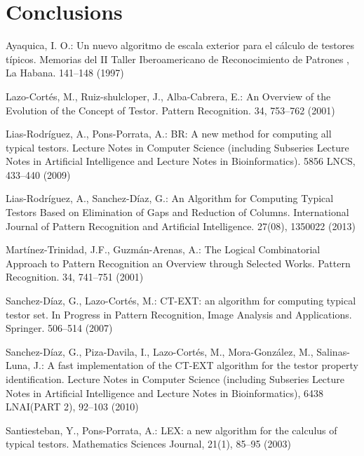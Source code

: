 \documentclass[citeauthoryear]{llncs}
\begin{document}
\section{Conclusions}
%
%
\begin{thebibliography}{}
%


	Ayaquica, I. O.:
	Un nuevo algoritmo de escala exterior para el c\'alculo de testores t\'ipicos.
	Memorias del II Taller Iberoamericano de Reconocimiento de Patrones , La
	Habana. 141--148 (1997)

	Lazo-Cort\'es, M., Ruiz-shulcloper, J., Alba-Cabrera, E.:
	An Overview of the Evolution of the Concept of Testor. 
	Pattern Recognition. 34, 753--762 (2001)

	Lias-Rodr\'iguez, A., Pons-Porrata, A.:
	BR: A new method for computing all typical testors. 
	Lecture Notes in Computer Science (including Subseries Lecture Notes 
	in Artificial Intelligence and Lecture Notes in Bioinformatics).
	5856 LNCS, 433--440 (2009)

	Lias-Rodr\'iguez, A., Sanchez-D\'iaz, G.:
 	An Algorithm for Computing Typical Testors Based on Elimination of Gaps and Reduction of Columns.
 	International Journal of Pattern Recognition and Artificial Intelligence. 27(08), 1350022 (2013)

	Mart\'inez-Trinidad, J.F., Guzm\'an-Arenas, A.: 
	The Logical Combinatorial Approach to Pattern Recognition an Overview through Selected Works. 
	Pattern Recognition. 34, 741--751 (2001)

	Sanchez-D\'iaz, G., Lazo-Cort\'es, M.:
	CT-EXT: an algorithm for computing typical testor set. 
	In Progress in Pattern Recognition, Image Analysis and Applications. Springer. 506--514 (2007)

	Sanchez-D\'iaz, G., Piza-Davila, I., Lazo-Cort\'es, M., Mora-Gonz\'alez, M., Salinas-Luna, J.:
	A fast implementation of the CT-EXT algorithm for the testor property identification. 
	Lecture Notes in Computer Science (including Subseries Lecture Notes in Artificial Intelligence and 
	Lecture	Notes in Bioinformatics), 6438 LNAI(PART 2), 92--103 (2010)

	Santiesteban, Y., Pons-Porrata, A.:
	LEX: a new algorithm for the calculus of typical testors. 
	Mathematics Sciences Journal, 21(1), 85--95 (2003)


\end{thebibliography}
\end{document}
